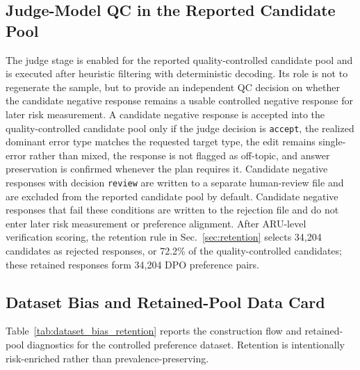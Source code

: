 \documentclass[a4paper,fleqn,doubleblind]{cas-sc}
\begin{document}
\subsection{Judge-Model QC in the Reported Candidate Pool}

The judge stage is enabled for the reported quality-controlled candidate pool and is executed after heuristic filtering with deterministic decoding. Its role is not to regenerate the sample, but to provide an independent QC decision on whether the candidate negative response remains a usable controlled negative response for later risk measurement. A candidate negative response is accepted into the quality-controlled candidate pool only if the judge decision is \texttt{accept}, the realized dominant error type matches the requested target type, the edit remains single-error rather than mixed, the response is not flagged as off-topic, and answer preservation is confirmed whenever the plan requires it. Candidate negative responses with decision \texttt{review} are written to a separate human-review file and are excluded from the reported candidate pool by default. Candidate negative responses that fail these conditions are written to the rejection file and do not enter later risk measurement or preference alignment. After ARU-level verification scoring, the retention rule in Sec.~\ref{sec:retention} selects 34,204 candidates as rejected responses, or 72.2\% of the quality-controlled candidates; these retained responses form 34,204 DPO preference pairs.

\subsection{Dataset Bias and Retained-Pool Data Card}
\label{app:dataset_bias_details}

Table~\ref{tab:dataset_bias_retention} reports the construction flow and retained-pool diagnostics for the controlled preference dataset. Retention is intentionally risk-enriched rather than prevalence-preserving.
\end{document}
